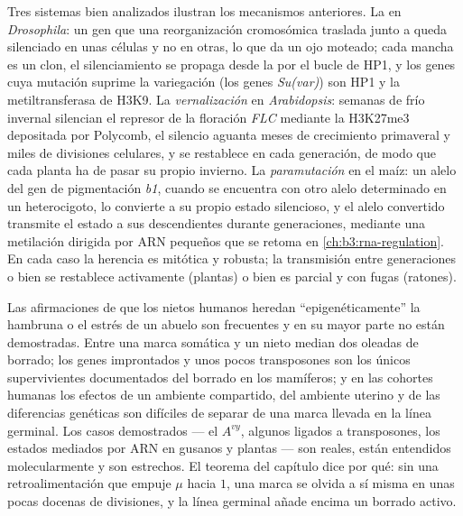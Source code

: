 \begin{proposition}\label{prop:b3:chromatin-epigenetics:examples}
Tres sistemas bien analizados ilustran los mecanismos anteriores. La
\emph{} en \emph{Drosophila}: un gen
que una reorganización cromosómica traslada junto a  queda
silenciado en unas células y no en otras, lo que da un ojo moteado; cada
mancha es un clon, el silenciamiento se propaga desde la 
por el bucle de HP1, y los genes cuya mutación suprime la variegación
(los genes \emph{Su(var)}) son HP1 y la metiltransferasa de H3K9. La
\emph{vernalización} en \emph{Arabidopsis}: semanas de frío invernal
silencian el represor de la floración \emph{FLC} mediante la H3K27me3
depositada por Polycomb, el silencio aguanta meses de crecimiento
primaveral y miles de divisiones celulares, y se restablece en cada
generación, de modo que cada planta ha de pasar su propio invierno. La
\emph{paramutación} en el maíz: un alelo del gen de pigmentación
\emph{b1}, cuando se encuentra con otro alelo determinado en un
heterocigoto, lo convierte a su propio estado silencioso, y el alelo
convertido transmite el estado a sus descendientes durante generaciones,
mediante una metilación dirigida por ARN pequeños que se retoma en
\cref{ch:b3:rna-regulation}. En cada caso la herencia es mitótica y
robusta; la transmisión entre generaciones o bien se restablece
activamente (plantas) o bien es parcial y con fugas (ratones).
\end{proposition}

\begin{remark}\label{rem:b3:chromatin-epigenetics:limits}
Las afirmaciones de que los nietos humanos heredan ``epigenéticamente''
la hambruna o el estrés de un abuelo son frecuentes y en su mayor parte
no están demostradas. Entre una marca somática y un nieto median dos
oleadas de borrado; los genes improntados y unos pocos transposones son
los únicos supervivientes documentados del borrado en los mamíferos; y en
las cohortes humanas los efectos de un ambiente compartido, del ambiente
uterino y de las diferencias genéticas son difíciles de separar de una
marca llevada en la línea germinal. Los casos demostrados --- el $A^{vy}$,
algunos  ligados a transposones, los estados mediados por ARN en
gusanos y plantas --- son reales, están entendidos molecularmente y son
estrechos. El teorema del capítulo dice por qué: sin una retroalimentación
que empuje $\mu$ hacia $1$, una marca se olvida a sí misma en unas pocas
docenas de divisiones, y la línea germinal añade encima un borrado activo.
\end{remark}

